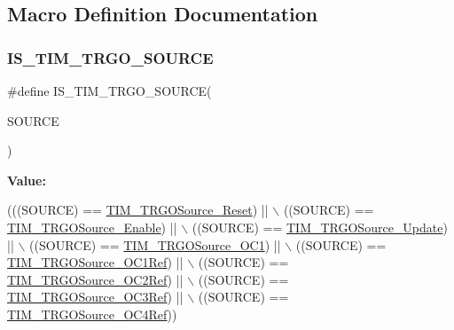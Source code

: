 \subsection{Macro Definition Documentation}
\mbox{\label{group___t_i_m___trigger___output___source_gadf4e4e0422bd9c108b184884781d2d46}} 
\subsubsection{\texorpdfstring{I\+S\+\_\+\+T\+I\+M\+\_\+\+T\+R\+G\+O\+\_\+\+S\+O\+U\+R\+CE}{IS\_TIM\_TRGO\_SOURCE}}
{\footnotesize\ttfamily \#define I\+S\+\_\+\+T\+I\+M\+\_\+\+T\+R\+G\+O\+\_\+\+S\+O\+U\+R\+CE(\begin{DoxyParamCaption}\item[{}]{S\+O\+U\+R\+CE }\end{DoxyParamCaption})}

{\bfseries Value\+:}
\begin{DoxyCode}
(((SOURCE) == \hyperlink{group___t_i_m___trigger___output___source_gafb039ed39279a4d1134b234797b1cdfb}{TIM\_TRGOSource\_Reset}) || \(\backslash\)
                                    ((SOURCE) == \hyperlink{group___t_i_m___trigger___output___source_gaa228ba6cfafcf676e33e3ee35cb7fc1c}{TIM\_TRGOSource\_Enable}) || \(\backslash\)
                                    ((SOURCE) == \hyperlink{group___t_i_m___trigger___output___source_ga8a73c717070ab1a0ef90326780f20aef}{TIM\_TRGOSource\_Update}) || \(\backslash\)
                                    ((SOURCE) == \hyperlink{group___t_i_m___trigger___output___source_ga2d044b472c021f5484b9f71eb9ca69f1}{TIM\_TRGOSource\_OC1}) || \(\backslash\)
                                    ((SOURCE) == \hyperlink{group___t_i_m___trigger___output___source_ga7cb70a2a026dc02136bdbb3dcc483d6c}{TIM\_TRGOSource\_OC1Ref}) || \(\backslash\)
                                    ((SOURCE) == \hyperlink{group___t_i_m___trigger___output___source_ga059f9f6cf96c833180eb3cdf5e56bd04}{TIM\_TRGOSource\_OC2Ref}) || \(\backslash\)
                                    ((SOURCE) == \hyperlink{group___t_i_m___trigger___output___source_ga40943bc1c3f22b983c683cbf0e87a218}{TIM\_TRGOSource\_OC3Ref}) || \(\backslash\)
                                    ((SOURCE) == \hyperlink{group___t_i_m___trigger___output___source_gafc81561599199912d613c65f760919bc}{TIM\_TRGOSource\_OC4Ref}))
\end{DoxyCode}



